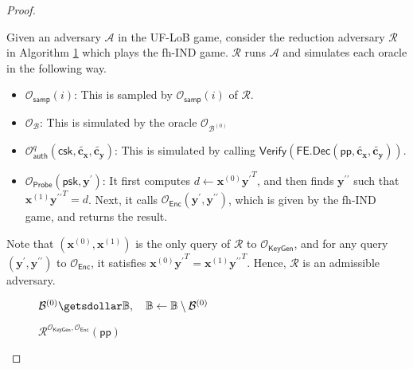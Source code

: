 \begin{proof}
\label{proof:ind-uf-lob3}

Given an adversary $\mathcal{A}$ in the \textsf{UF-LoB} game, consider the reduction adversary $\mathcal{R}$ in Algorithm \ref{alg:reduction1-ind-uf-lob3_game} which plays the \textsf{fh-IND} game. $\mathcal{R}$ runs $\mathcal{A}$ and simulates each oracle in the following way.

\begin{itemize}
	\item $\mathcal{O}_{\textsf{samp}}(i)$: This is sampled by $\mathcal{O}_{\textsf{samp}}(i)$ of $\mathcal{R}$.
	
	\item $\mathcal{O}_{\mathcal{B}}$: This is simulated by the oracle $\mathcal{O}_{\mathcal{B}^{(0)}}$

	\item $\mathcal{O}_{\textsf{auth}}^q (\textsf{csk}, \mathbf{\tilde{c_x}}, \mathbf{\tilde{c_y}})$: This is simulated by calling $\textsf{Verify}( \textsf{FE.Dec}(\textsf{pp}, \mathbf{\tilde{c_x}}, \mathbf{\tilde{c_y}}) )$.

	\item $\mathcal{O}_{\textsf{Probe}}( \textsf{psk}, \mathbf{y}^\prime )$: It first computes $d \gets \mathbf{x}^{(0)}{\mathbf{y}^\prime}^T$, and then finds $\mathbf{y}^{\prime\prime}$ such that $\mathbf{x}^{(1)}{\mathbf{y}^{\prime\prime}}^T = d$. Next, it calls $\mathcal{O}_{\textsf{Enc}}(\mathbf{y}^\prime, {\mathbf{y}^{\prime\prime}})$, which is given by the \textsf{fh-IND} game, and returns the result.

\end{itemize}

\noindent Note that $(\mathbf{x}^{(0)}, \mathbf{x}^{(1)})$ is the only query of $\mathcal{R}$ to $\mathcal{O}_{\textsf{KeyGen}}$, and for any query $( \mathbf{y}^\prime, {\mathbf{y}^{\prime\prime}} )$ to $\mathcal{O}_{\textsf{Enc}}$, it satisfies $\mathbf{x}^{(0)}{\mathbf{y}^\prime}^T = \mathbf{x}^{(1)}{\mathbf{y}^{\prime\prime}}^T$. Hence, $\mathcal{R}$ is an admissible adversary.

\begin{figure}[h]
\centering
	
	\begin{minipage}[t]{0.5\linewidth}
	\centering
	\begin{algorithm}[H]
		\caption{$\mathcal{R}^{\mathcal{O}_{\textsf{KeyGen}}, \mathcal{O}_{\textsf{Enc}}}(\textsf{pp})$}
	\label{alg:reduction1-ind-uf-lob3_game}
	\begin{algorithmic}[1]
		\State $\mathcal{B}^{(0)} \getsdollar \mathbb{B}, \quad \mathbb{B} \gets \mathbb{B} \setminus \mathcal{B}^{(0)}$


\end{algorithmic}
\end{algorithm}
\end{minipage}
\end{figure}
\end{proof}
